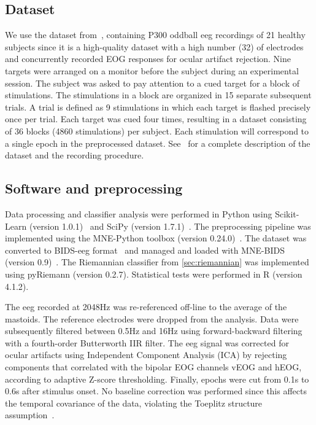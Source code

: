 	\subsection{Dataset}
	We use the dataset from~\textcite{Wittevrongel2016}, containing P300 oddball \ac{eeg}
	recordings of 21 healthy subjects since it is a high-quality dataset with a high
	number (32) of electrodes and concurrently recorded EOG responses for ocular artifact rejection.
	Nine targets were arranged on a monitor before the subject during an
	experimental session.
	The subject was asked to pay attention to a cued target for a block
	of stimulations.
	The stimulations in a block are organized in 15 separate subsequent trials.
	A trial is defined as 9 stimulations in which each target is flashed
	precisely once per trial.
	Each target was cued four times, resulting in a dataset consisting of 36 blocks
	(4860 stimulations) per subject.
	Each stimulation will correspond to a single epoch in the preprocessed dataset.
	See~\textcite{Wittevrongel2016} for a complete description of the dataset and the recording procedure.

	\subsection{Software and preprocessing}
	Data processing and classifier analysis were performed in Python using
	Scikit-Learn (version 1.0.1)~\cite{Pedregosa2011} and SciPy (version
	1.7.1)~\cite{Virtanen2020}.
	The preprocessing pipeline was implemented using the MNE-Python toolbox
	(version 0.24.0)~\cite{Gramfort2013}.
	The dataset was converted to BIDS-\ac{eeg} format~\cite{Pernet2019} and managed and
	loaded with MNE-BIDS (version 0.9)~\cite{Appelhoff2019}.
	The Riemannian classifier from \cref{sec:riemannian} was implemented using
	pyRiemann (version 0.2.7).
	Statistical tests were performed in R (version 4.1.2).

	The \ac{eeg} recorded at 2048Hz was re-referenced off-line to the average of the mastoids.
	The reference electrodes were dropped from the analysis.
	Data were subsequently filtered between 0.5Hz and 16Hz using forward-backward
	filtering with a fourth-order Butterworth IIR filter.
	The \ac{eeg} signal was corrected for ocular artifacts using Independent Component
	Analysis (ICA) by rejecting components that correlated with the bipolar EOG channels vEOG and hEOG, according to adaptive Z-score thresholding.
	Finally, epochs were cut from 0.1s to 0.6s after stimulus onset.
	No baseline correction was performed since this affects the temporal covariance
	of the data, violating the Toeplitz structure assumption~\cite{Bijma2003}.

